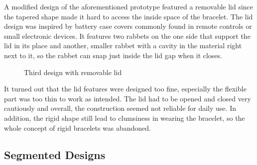 A modified design of the aforementioned prototype featured a removable lid since the tapered shape made it hard to access the inside space of the bracelet. The lid design was inspired by battery case covers commonly found in remote controls or small electronic devices. It features two rabbets on the one side that support the lid in its place and another, smaller rabbet with a cavity in the material right next to it, so the rabbet can snap just inside the lid gap when it closes.

\begin{figure}[bth]
	\myfloatalign
	 \quad
	\caption{Third design with removable lid}
\end{figure}

It turned out that the lid features were designed too fine, especially the flexible part was too thin to work as intended. The lid had to be opened and closed very cautiously and overall, the construction seemed not reliable for daily use. In addition, the rigid shape still lead to clumsiness in wearing the bracelet, so the whole concept of rigid bracelets was abandoned.

\subsection{Segmented Designs}

